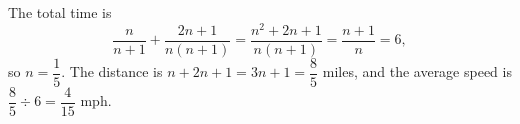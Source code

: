 The total time is
\[\dfrac{n}{n+1}+\dfrac{2n+1}{n(n+1)}=\dfrac{n^2+2n+1}{n(n+1)}=\dfrac{n+1}{n}=6,\]
so $n=\dfrac{1}{5}$. The distance is $n+2n+1=3n+1=\dfrac{8}{5}$ miles, and the average speed is $\dfrac{8}{5}\div6=\boxed{\dfrac{4}{15}}$ mph.
